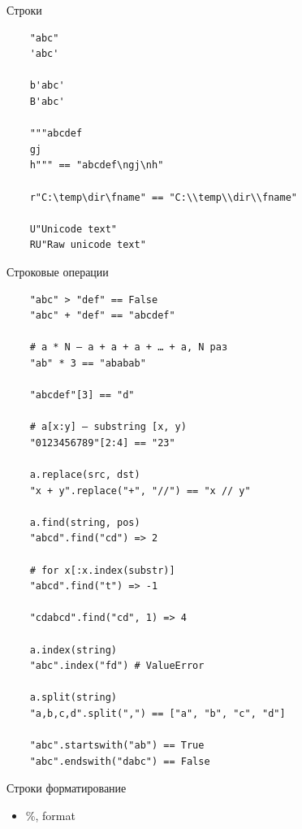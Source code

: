 \documentclass{article}
\begin{document}
\begin{center} Строки \end{center}
\vspace{15pt}
\begin{lstlisting}
	"abc"
	'abc'

	b'abc'
	B'abc'

	"""abcdef
	gj
	h""" == "abcdef\ngj\nh"

	r"C:\temp\dir\fname" == "C:\\temp\\dir\\fname"

	U"Unicode text"
	RU"Raw unicode text"
\end{lstlisting}
\newpage

\begin{center} Строковые операции \end{center}
\vspace{15pt}
\begin{lstlisting}
	"abc" > "def" == False
	"abc" + "def" == "abcdef"

	# a * N – a + a + a + … + a, N раз
	"ab" * 3 == "ababab"

	"abcdef"[3] == "d"

	# a[x:y] – substring [x, y)
	"0123456789"[2:4] == "23"

	a.replace(src, dst)
	"x + y".replace("+", "//") == "x // y"

	a.find(string, pos) 
	"abcd".find("cd") => 2
	
	# for x[:x.index(substr)]
	"abcd".find("t") => -1

	"cdabcd".find("cd", 1) => 4

	a.index(string)
	"abc".index("fd") # ValueError

	a.split(string) 
	"a,b,c,d".split(",") == ["a", "b", "c", "d"]

	"abc".startswith("ab") == True
	"abc".endswith("dabc") == False
\end{lstlisting}
\newpage

\begin{center} Строки форматирование \end{center}
\begin{itemize}
	\item \%, format
\end{itemize}
\end{document}
